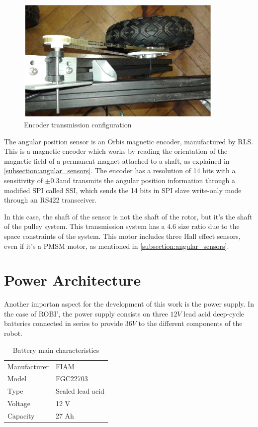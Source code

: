 \begin{figure}[htbp]
\centering
\includegraphics[width=10cm]{Images/orbis_pulley.png} 
\caption[Encoder Transmission Configuration]{Encoder transmission configuration}
\label{fig:orbis_pulley}
\end{figure}

The angular position sensor is an Orbis magnetic encoder, manufactured by RLS. This is a magnetic encoder which works by reading the orientation of the magnetic field of a permanent magnet attached to a shaft, as explained in \ref{subsection:angular_sensors}. The encoder has a resolution of 14 bits with a sensitivity of $\pm0.3$\degree and transmits the angular position information through a modified \acf{SPI} called \acf{SSI}, which sends the 14 bits in \ac{SPI} slave write-only mode through an RS422 transceiver. 

In this case, the shaft of the sensor is not the shaft of the rotor, but it's the shaft of the pulley system. This transmission system has a 4.6 size ratio due to the space constraints of the system. This motor includes three Hall effect sensors, even if it's a \ac{PMSM} motor, as mentioned in \ref{subsection:angular_sensors}.

\section{Power Architecture}

Another importan aspect for the development of this work is the power supply. In the case of ROBI', the power supply consists on three $12V$ lead acid deep-cycle batteries connected in series to provide $36V$ to the different components of the robot.

\begin{table}[]
\centering
\caption{Battery main characteristics}
\label{table:battery}
\begin{tabular}{@{}ll@{}}
\toprule
Manufacturer	&	FIAM				\\
Model			&	FGC22703			\\
Type			&	Sealed lead acid 	\\
Voltage			&	12 V 				\\
Capacity 		&  	27 Ah 				\\
\bottomrule
\end{tabular}
\end{table}

